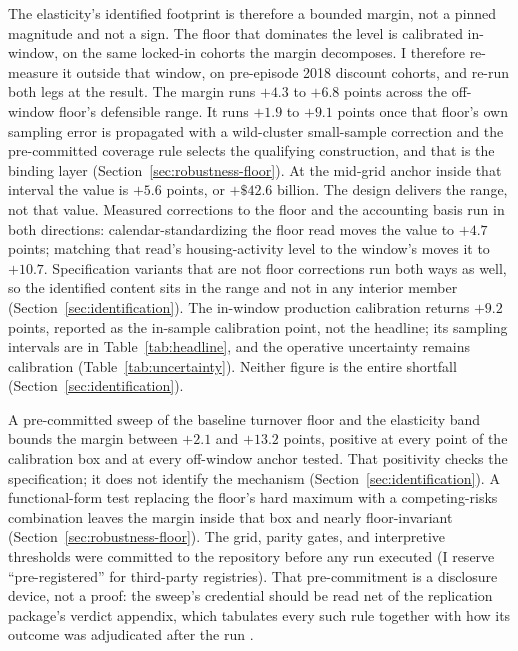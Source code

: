 \documentclass[12pt]{article}
\begin{document}
The elasticity's identified footprint is therefore a bounded margin, not a pinned magnitude and not a sign. The floor that dominates the level is calibrated in-window, on the same locked-in cohorts the margin decomposes. I therefore re-measure it outside that window, on pre-episode 2018 discount cohorts, and re-run both legs at the result. The margin runs $+4.3$ to $+6.8$ points across the off-window floor's defensible range. It runs $+1.9$ to $+9.1$ points once that floor's own sampling error is propagated with a wild-cluster small-sample correction and the pre-committed coverage rule selects the qualifying construction, and that is the binding layer (Section~\ref{sec:robustness-floor}). At the mid-grid anchor inside that interval the value is $+5.6$ points, or $+\$42.6$ billion. The design delivers the range, not that value. Measured corrections to the floor and the accounting basis run in both directions: calendar-standardizing the floor read moves the value to $+4.7$ points; matching that read's housing-activity level to the window's moves it to $+10.7$. Specification variants that are not floor corrections run both ways as well, so the identified content sits in the range and not in any interior member (Section~\ref{sec:identification}). The in-window production calibration returns $+9.2$ points, reported as the in-sample calibration point, not the headline; its sampling intervals are in Table~\ref{tab:headline}, and the operative uncertainty remains calibration (Table~\ref{tab:uncertainty}). Neither figure is the entire shortfall (Section~\ref{sec:identification}).

A pre-committed sweep of the baseline turnover floor and the elasticity band bounds the margin between $+2.1$ and $+13.2$ points, positive at every point of the calibration box and at every off-window anchor tested. That positivity checks the specification; it does not identify the mechanism (Section~\ref{sec:identification}). A functional-form test replacing the floor's hard maximum with a competing-risks combination leaves the margin inside that box and nearly floor-invariant (Section~\ref{sec:robustness-floor}). The grid, parity gates, and interpretive thresholds were committed to the repository before any run executed (I reserve ``pre-registered'' for third-party registries). That pre-commitment is a disclosure device, not a proof: the sweep's credential should be read net of the replication package's verdict appendix, which tabulates every such rule together with how its outcome was adjudicated after the run \citep{olken2015}.
\end{document}
